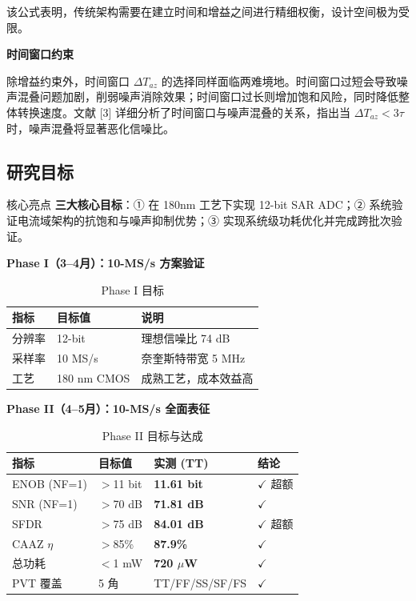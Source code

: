 \documentclass[11pt,a4paper,UTF8]{ctexart}
\begin{document}
该公式表明，传统架构需要在建立时间和增益之间进行精细权衡，设计空间极为受限。

\textbf{时间窗口约束}

除增益约束外，时间窗口 $\Delta T_{az}$ 的选择同样面临两难境地。时间窗口过短会导致噪声混叠问题加剧，削弱噪声消除效果；时间窗口过长则增加饱和风险，同时降低整体转换速度。文献 [3] 详细分析了时间窗口与噪声混叠的关系，指出当 $\Delta T_{az} < 3\tau$ 时，噪声混叠将显著恶化信噪比。

\subsection{研究目标}

\begin{findbox}{核心亮点}
\textbf{三大核心目标}：① 在 180nm 工艺下实现 12-bit SAR ADC；② 系统验证电流域架构的抗饱和与噪声抑制优势；③ 实现系统级功耗优化并完成跨批次验证。
\end{findbox}

\textbf{Phase I（3--4月）：10-MS/s 方案验证}

\begin{table}[htbp]\centering\caption{Phase I 目标}\label{tab:phase1-goal}\small
\begin{tabular}{lll}\toprule
\textbf{指标} & \textbf{目标值} & \textbf{说明} \\\midrule
分辨率 & 12-bit & 理想信噪比 74 dB \\
采样率 & 10 MS/s & 奈奎斯特带宽 5 MHz \\
工艺 & 180 nm CMOS & 成熟工艺，成本效益高 \\\bottomrule
\end{tabular}
\end{table}

\textbf{Phase II（4--5月）：10-MS/s 全面表征}

\begin{table}[htbp]\centering\caption{Phase II 目标与达成}\label{tab:phase2-goal}\small
\begin{tabular}{llll}\toprule
\textbf{指标} & \textbf{目标值} & \textbf{实测 (TT)} & \textbf{结论} \\\midrule
ENOB (NF=1) & $>$11 bit & \textbf{11.61 bit} & $\checkmark$ 超额 \\
SNR (NF=1) & $>$70 dB & \textbf{71.81 dB} & $\checkmark$ \\
SFDR & $>$75 dB & \textbf{84.01 dB} & $\checkmark$ 超额 \\
CAAZ $\eta$ & $>$85\% & \textbf{87.9\%} & $\checkmark$ \\
总功耗 & $<$1 mW & \textbf{720 $\mu$W} & $\checkmark$ \\
PVT 覆盖 & 5 角 & TT/FF/SS/SF/FS & $\checkmark$ \\\bottomrule
\end{tabular}
\end{table}
\end{document}
